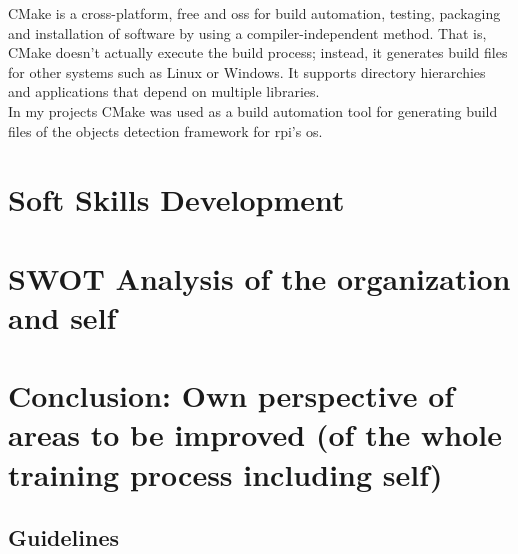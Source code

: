 \documentclass[a4paper,12pt]{report}%
\begin{document}
CMake is a cross-platform, free and \ac{oss} for build automation, testing, packaging and installation of software by using a compiler-independent method. That is, CMake doesn't actually execute the build process; instead, it generates build files for other systems such as Linux or Windows. It supports directory hierarchies and applications that depend on multiple libraries\cite{cmakewiki}.\\

In my projects CMake was used as a build automation tool for generating build files of the objects detection framework for \ac{rpi}'s \ac{os}.

\chapter{Soft Skills Development}

\chapter{SWOT Analysis of the organization and self}

\chapter{Conclusion: Own perspective of areas to be improved (of the whole training process including self)}


\begin{appendices}
	\chapter{Guidelines}
\end{appendices}

\footnotesize{
\twocolumn

}

\end{document}
